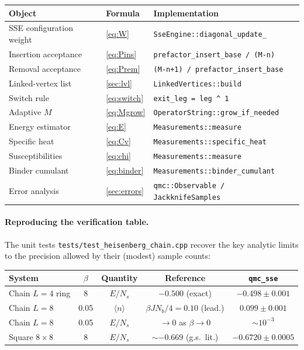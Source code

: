 \documentclass[11pt,a4paper]{article}
\newcommand{\Nb}{N_{b}}
\newcommand{\Ns}{N_{s}}
\theoremstyle{definition}
\theoremstyle{plain}
\begin{document}
\begin{center}
\begin{tabular}{@{}lll@{}}
\toprule
Object & Formula & Implementation \\\midrule
SSE configuration weight & \cref{eq:W} &
    \lstinline|SseEngine::diagonal_update_| \\
Insertion acceptance     & \cref{eq:Pins} &
    \lstinline|prefactor_insert_base / (M-n)| \\
Removal acceptance       & \cref{eq:Prem} &
    \lstinline|(M-n+1) / prefactor_insert_base| \\
Linked-vertex list       & \cref{sec:lvl} &
    \lstinline|LinkedVertices::build| \\
Switch rule              & \cref{eq:switch} &
    \lstinline|exit_leg = leg ^ 1| \\
Adaptive $M$             & \cref{eq:Mgrow} &
    \lstinline|OperatorString::grow_if_needed| \\
Energy estimator         & \cref{eq:E} &
    \lstinline|Measurements::measure| \\
Specific heat            & \cref{eq:Cv} &
    \lstinline|Measurements::specific_heat| \\
Susceptibilities         & \cref{eq:chi} &
    \lstinline|Measurements::measure| \\
Binder cumulant          & \cref{eq:binder} &
    \lstinline|Measurements::binder_cumulant| \\
Error analysis           & \cref{sec:errors} &
    \lstinline|qmc::Observable / JackknifeSamples| \\
\bottomrule
\end{tabular}
\end{center}

\paragraph{Reproducing the verification table.}
The unit tests \lstinline|tests/test_heisenberg_chain.cpp| recover the
key analytic limits to the precision allowed by their (modest) sample
counts:

\begin{center}
\begin{tabular}{@{}lcccc@{}}
\toprule
System & $\beta$ & Quantity & Reference & \texttt{qmc\_sse} \\\midrule
Chain $L=4$ ring  & 8     & $E/\Ns$            & $-0.500$ (exact)            & $-0.498\pm 0.001$ \\
Chain $L=8$       & 0.05  & $\langle n\rangle$ & $\beta J\Nb/4=0.10$ (lead.) & $0.099\pm 0.001$ \\
Chain $L=8$       & 0.05  & $E/\Ns$            & $\to 0$ as $\beta\to 0$     & $\sim 10^{-3}$    \\
Square $8\times 8$& 8     & $E/\Ns$            & $\sim -0.669$ (g.s.~lit.)   & $-0.6720\pm 0.0005$ \\
\bottomrule
\end{tabular}
\end{center}
\end{document}
